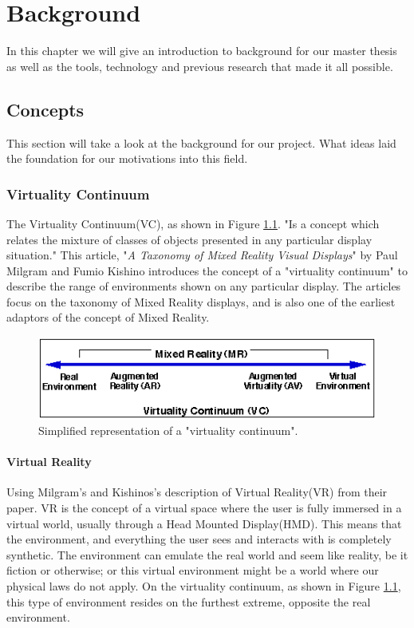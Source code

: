 \chapter{Background}
\label{chap:background}
In this chapter we will give an introduction to background for our master thesis as well as the tools, technology and previous research that made it all possible. 

\section{Concepts}
    This section will take a look at the background for our project. What ideas laid the foundation for our motivations into this field.
    
    \subsection{Virtuality Continuum}
    The Virtuality Continuum(VC), as shown in Figure \ref{fig:virtualcontinuum}. "Is a concept which relates the mixture of classes of objects presented in any particular display situation."\cite{Milgram1994} This article, "\emph{A Taxonomy of Mixed Reality Visual Displays}" by Paul Milgram and Fumio Kishino\cite{Milgram1994} introduces the concept of a "virtuality continuum" to describe the range of environments shown on any particular display. The articles focus on the taxonomy of Mixed Reality displays, and is also one of the earliest adaptors of the concept of Mixed Reality.
    \begin{figure}[h!]
        \centering
        \includegraphics[scale=1]{figures/virtualcontinuum.png}
        \caption{Simplified representation of a "virtuality continuum".\cite{Milgram1994}}
        \label{fig:virtualcontinuum}
    \end{figure}
    
    \subsubsection{Virtual Reality}
    Using Milgram's and Kishinos's description of Virtual Reality(VR) from their paper.\cite{Milgram1994} VR is the concept of a virtual space where the user is fully immersed in a virtual world, usually through a Head Mounted Display(HMD). This means that the environment, and everything the user sees and interacts with is completely synthetic. The environment can emulate the real world and seem like reality, be it fiction or otherwise; or this virtual environment might be a world where our physical laws do not apply. On the virtuality continuum, as shown in Figure \ref{fig:virtualcontinuum}, this type of environment resides on the furthest extreme, opposite the real environment.

